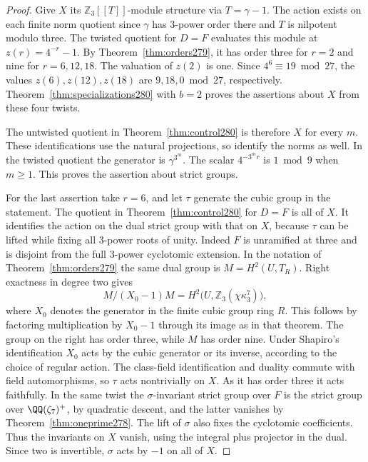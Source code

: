 \documentclass[a4paper,11pt]{article}
\theoremstyle{definition}
\theoremstyle{remark}
\newcommand{\ZZ}{\mathbb Z}\newcommand{\ord}{\operatorname{ord}}
\numberwithin{equation}{section}
\begin{document}
\begin{proof}
Give \(X\) its \(\ZZ_3[[T]]\)-module structure via \(T=\gamma-1\).
The action exists on each finite norm quotient since \(\gamma\)
has \(3\)-power order there and \(T\) is nilpotent modulo three.
The twisted quotient for \(D=F\) evaluates this module at
\(z(r)=4^{-r}-1\). By Theorem~\ref{thm:orders279}, it has order
three for \(r=2\) and nine for \(r=6,12,18\). The valuation
of \(z(2)\) is one. Since \(4^6\equiv19\bmod27\), the values
\(z(6),z(12),z(18)\) are \(9,18,0\bmod27\), respectively.
Theorem~\ref{thm:specializations280} with \(b=2\) proves the
assertions about \(X\) from these four twists.

The untwisted quotient in Theorem~\ref{thm:control280} is
therefore \(X\) for every \(m\). These identifications use the
natural projections, so identify the norms as well. In the
twisted quotient the generator is \(\gamma^{3^m}\). The scalar
\(4^{-3^m r}\) is \(1\bmod9\) when \(m\ge1\). This proves the
assertion about strict groups.

For the last assertion take \(r=6\), and let \(\tau\) generate
the cubic group in the statement. The quotient in
Theorem~\ref{thm:control280} for \(D=F\) is all of \(X\).
It identifies the action on the dual strict group with that
on \(X\), because \(\tau\) can be lifted while fixing all
\(3\)-power roots of unity. Indeed \(F\) is unramified at
three and is disjoint from the full \(3\)-power cyclotomic
extension. In the notation of Theorem~\ref{thm:orders279} the
same dual group is \(M=H^2(U,T_R)\).
Right exactness in degree two gives
\[
            M/(X_0-1)M=
              H^2\bigl(U,\ZZ_3(\chi\kappa_3^{7})\bigr),
\]
where \(X_0\) denotes the generator in the finite cubic group
ring \(R\). This follows by factoring multiplication by
\(X_0-1\) through its image as in that theorem.
The group on the right has order three, while \(M\) has order
nine. Under Shapiro's identification \(X_0\) acts by the cubic
generator or its inverse, according to the choice of regular
action. The class-field identification and duality commute with
field automorphisms, so \(\tau\) acts nontrivially on \(X\).
As it has order three it acts faithfully. In the same twist
the \(\sigma\)-invariant strict group over \(F\) is the strict
group over \(\QQ(\zeta_7)^+\), by quadratic descent, and the
latter vanishes by Theorem~\ref{thm:oneprime278}. The lift of
\(\sigma\) also fixes the cyclotomic coefficients. Thus the
invariants on \(X\) vanish, using the integral plus projector
in the dual. Since two is invertible, \(\sigma\) acts by
\(-1\) on all of \(X\).
\end{proof}
\end{document}
